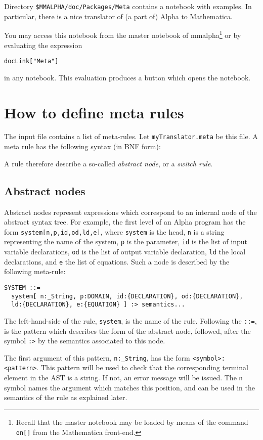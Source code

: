 \documentclass[12pt]{article}
\newcommand{\mmalpha}{{\sc mmalpha}}
\begin{document}
Directory \texttt{\$MMALPHA/doc/Packages/Meta} contains a notebook with 
examples. In particular, there is a nice translator of (a part of) Alpha to Mathematica.

You may access this notebook from the master notebook of 
\mmalpha{}\footnote{
Recall that the master notebook may be loaded by means of the command 
\texttt{on[]} from the Mathematica front-end.}
or by evaluating the expression
\begin{verbatim}
docLink["Meta"]
\end{verbatim}
in any notebook. This evaluation produces a button which opens the 
notebook.


\section{How to define meta rules}
\label{define}
The input file contains a list of meta-rules.
 Let 
\texttt{myTranslator.meta}
 be this file.
 A meta rule has the following syntax (in BNF form):


A rule therefore describe a so-called 
{\em abstract node}, or a 
{\em switch rule}.
 
\subsection{Abstract nodes}
Abstract nodes represent expressions which correspond to an internal node
 of the abstract syntax tree.
 For example, the first level of an Alpha program has the form 
\texttt{system[n,p,id,od,ld,e]}, where 
\texttt{system} is the head, 
\texttt{n} is a string representing the name of the system, 
\texttt{p} is the parameter, 
\texttt{id} is the list of input variable declarations, 
\texttt{od} is the list of output variable declaration, 
\texttt{ld} the local declarations, and 
\texttt{e} the list of equations.
Such a node is described by the following meta-rule: 
\begin{verbatim}
SYSTEM ::= 
  system[ n:_String, p:DOMAIN, id:{DECLARATION}, od:{DECLARATION}, 
  ld:{DECLARATION}, e:{EQUATION} ] :> semantics...
\end{verbatim}
The left-hand-side of the rule, 
\texttt{system}, is the name of the rule.
 Following the 
\texttt{::=}, is the pattern which describes the form of the abstract node, followed,
 after the symbol 
\texttt{:>} by the semantics associated to this node.

The first argument of this pattern, 
\texttt{n:\_String}, has the form 
\texttt{<symbol>:<pattern>}.
 This pattern will be used to check that the corresponding terminal element
 in the AST is a string.
 If not, an error message will be issued.
 The 
\texttt{n} symbol names the argument which matches this position, and can be used
 in the semantics of the rule as explained later.
\end{document}
